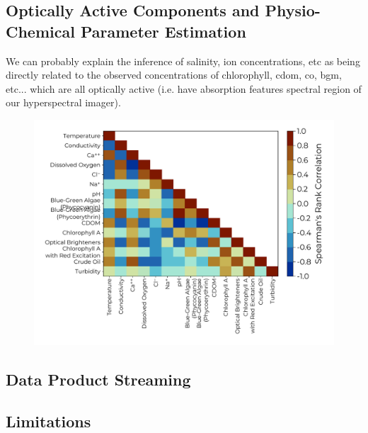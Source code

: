 \documentclass[journal,article,submit,pdftex,moreauthors]{Definitions/mdpi}
\begin{document}
\subsection{Optically Active Components and Physio-Chemical Parameter Estimation}

We can probably explain the inference of salinity, ion concentrations, etc as being directly related to the observed concentrations of chlorophyll, cdom, co, bgm, etc... which are all optically active (i.e. have absorption features spectral region of our hyperspectral imager).

\begin{figure}[H]
\includegraphics[width=10.5 cm]{paper/figures/results/target_correlations.pdf}
\caption{\label{fig:target-correlations}}
\end{figure}   



\subsection{Data Product Streaming}

\subsection{Limitations}
\end{document}
